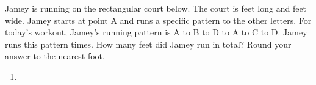 Jamey is running on the rectangular court below. The court is  feet long and  feet wide. Jamey starts at point A and runs a specific pattern to the other letters. For today’s workout, Jamey’s running pattern is A to B to D to A to C to D. Jamey runs this pattern  times. How many feet did Jamey run in total? Round your answer to the nearest foot.  
\newline
{}
\begin{enumerate}
    \item
\end{enumerate}